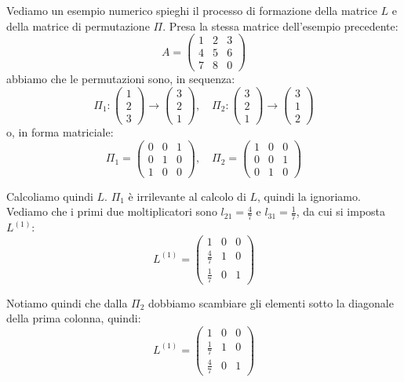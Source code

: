 \documentclass[a4paper,11pt]{article}
\begin{document}
\par\smallskip 

Vediamo un esempio numerico spieghi il processo di formazione della matrice $L$ e della matrice di permutazione $\Pi$.
Presa la stessa matrice dell'esempio precedente:
$$
A = \begin{pmatrix}
	1 & 2 & 3 \\ 
	4 & 5 & 6 \\ 
	7 & 8 & 0
\end{pmatrix}
$$
abbiamo che le permutazioni sono, in sequenza:
$$
\Pi_1 : 
\begin{pmatrix}
	1 \\ 2 \\ 3
\end{pmatrix}
\rightarrow
\begin{pmatrix}
	3 \\ 2 \\ 1
\end{pmatrix}, \quad 
\Pi_2 :
\begin{pmatrix}
	3 \\ 2 \\ 1
\end{pmatrix}
\rightarrow
\begin{pmatrix}
	3 \\ 1 \\ 2
\end{pmatrix}
$$
o, in forma matriciale:
$$
\Pi_1 = \begin{pmatrix}
	0 & 0 & 1 \\ 
	0 & 1 & 0 \\ 
	1 & 0 & 0
\end{pmatrix}, \quad
\Pi_2 = \begin{pmatrix}
	1 & 0 & 0 \\ 
	0 & 0 & 1 \\ 
	0 & 1 & 0
\end{pmatrix}
$$

Calcoliamo quindi $L$.
$\Pi_1$ è irrilevante al calcolo di $L$, quindi la ignoriamo.
Vediamo che i primi due moltiplicatori sono $l_{21} = \frac{4}{7}$ e $l_{31} = \frac{1}{7}$, da cui si imposta $L^{(1)}$:
$$
L^{(1)} = \begin{pmatrix}
	1 & 0 & 0 \\ 
	\frac{4}{7} & 1 & 0 \\ 
	\frac{1}{7} & 0 & 1
\end{pmatrix}
$$

Notiamo quindi che dalla $\Pi_2$ dobbiamo scambiare gli elementi sotto la diagonale della prima colonna, quindi:
$$
L^{(1)} = \begin{pmatrix}
	1 & 0 & 0 \\ 
	\frac{1}{7} & 1 & 0 \\ 
	\frac{4}{7} & 0 & 1
\end{pmatrix}
$$
\end{document}
